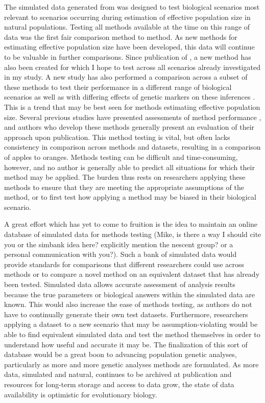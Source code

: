 The simulated data generated from  was designed to test biological scenarios most relevant to scenarios occurring during estimation of effective population size in natural populations. Testing all methods available at the time on this range of data was the first fair comparison method to method. As new methods for estimating effective population size have been developed, this data will continue to be valuable in further comparisons. Since publication of , a new method \citep{Hui:2015} has also been created for which I hope to test across all scenarios already investigated in my study. A new study has also performed a comparison across a subset of these methods to test their performance in a different range of biological scenarios as well as with differing effects of genetic markers on these inferences \citep{Wang:2016}. This is a trend that may be best seen for methods estimating effective population size. Several previous studies have presented assessments of method performance \citep{Ryman:2013, Neel:2013, Holleley:2013, Hoehn:2012, Barker:2011}, and authors who develop these methods generally present an evaluation of their approach upon publication. This method testing is vital, but often lacks consistency in comparison across methods and datasets, resulting in a comparison of apples to oranges. Methods testing can be difficult and time-consuming, however, and no author is generally able to predict all situations for which their method may be applied. The burden thus rests on researchers applying these methods to ensure that they are meeting the appropriate assumptions of the method, or to first test how applying a method may be biased in their biological scenario.

A great effort which has yet to come to fruition is the idea to maintain an online database of simulated data for methods testing (\color{red}Mike, is there a way I should cite you or the simbank idea here? explicitly mention the nescent group? or a personal communication with you?\color{black}). Such a bank of simulated data would provide standards for comparisons that different researchers could use across methods or to compare a novel method on an equivalent dataset that has already been tested. Simulated data allows accurate assessment of analysis results because the true parameters or biological answers within the simulated data are known. This would also increase the ease of methods testing, as authors do not have to continually generate their own test datasets. Furthermore, researchers applying a dataset to a new scenario that may be assumption-violating would be able to find equivalent simulated data and test the method themselves in order to understand how useful and accurate it may be. The finalization of this sort of database would be a great boon to advancing population genetic analyses, particularly as more and more genetic analyses methods are formulated. As more data, simulated and natural, continues to be archived at publication and resources for long-term storage and access to data grow, the state of data availability is optimistic for evolutionary biology.

